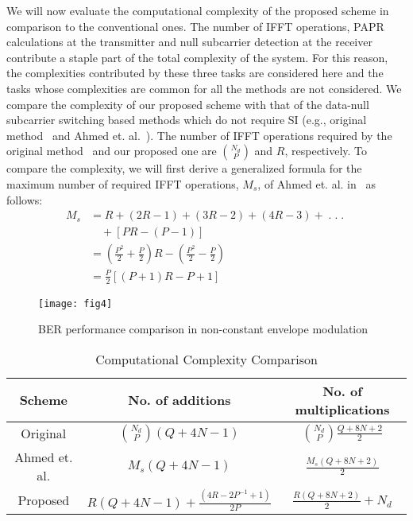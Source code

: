 \documentclass[journal,comsoc]{IEEEtran}
\begin{document}
   We will now evaluate the computational complexity of the proposed scheme in comparison to the conventional ones. The number of IFFT operations, PAPR calculations at the transmitter and null subcarrier detection at the receiver contribute a staple part of the total complexity of the system. For this reason, the complexities contributed by these three tasks are considered here and the tasks whose complexities are common for all the methods are not considered. We compare the complexity of our proposed scheme with that of the data-null subcarrier switching based methods which do not require SI (e.g., original method~\cite{wong1} and Ahmed et. al.~\cite{sabbir2}). The number of IFFT operations required by the original method~\cite{wong1} and our proposed one are $N_d \choose P$ and $R$, respectively. To compare the complexity, we will first derive a generalized formula for the maximum number of required IFFT operations, $M_s$, of Ahmed et. al. in~\cite{sabbir2} as follows: 
   \begin{equation*}
   \begin{split}
   M_s&=R+(2R-1)+(3R-2)+(4R-3)+\;.\;.\;.\;\\
   & \quad +[PR-(P-1)]\\
    & =\left(\frac{P^2}{2}+\frac{P}{2}\right)R-\left(\frac{P^2}{2}-\frac{P}{2}\right)\\
    & =\frac{P}{2}[(P+1)R-P+1]
   \end{split}
   \end{equation*}

\begin{figure}[!t]
\centering
\texttt{[image: fig4]}
\caption{BER performance comparison in non-constant envelope modulation}

\label{fig4}
\end{figure}
   
\begin{table}[]
\centering
\caption{Computational Complexity Comparison}
\label{tabl2}
\begin{tabular}{|c|c|c|}
\hline
Scheme & No. of additions & No. of multiplications \\ \hline
Original & $N_d \choose P$$(Q+4N-1)$ & $N_d \choose P$$\frac{Q+8N+2}{2}$ \\ \hline
Ahmed et. al. & $M_s(Q+4N-1)$ & $\frac{M_s(Q+8N+2)}{2}$ \\ \hline
Proposed & $R(Q+4N-1)+\frac{(4R-2P^{-1}+1)}{2P}$ & $\frac{R(Q+8N+2)}{2}+N_d$ \\ \hline
\end{tabular}
\end{table}
\end{document}
